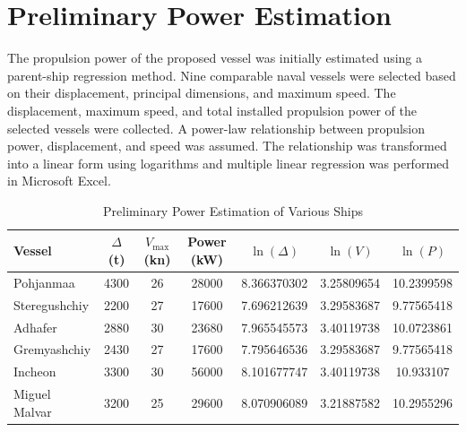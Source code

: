 \documentclass[12pt,a4paper,twoside]{report}
\begin{document}
\section{Preliminary Power Estimation}
The propulsion power of the proposed vessel was initially estimated using a parent-ship regression method. Nine comparable naval vessels were selected based on their displacement, principal dimensions, and maximum speed. The displacement, maximum speed, and total installed propulsion power of the selected vessels were collected. A power-law relationship between propulsion power, displacement, and speed was assumed. The relationship was transformed into a linear form using logarithms and multiple linear regression was performed in Microsoft Excel.
\begin{table}[htbp]
    \centering
    \caption{Preliminary Power Estimation of Various Ships}
    \label{tab:preliminary_power_estimation}

    \footnotesize
    \setlength{\tabcolsep}{3.5pt}

    \begin{tabular}{lcccccc}
        \toprule
        \textbf{Vessel} &
        \textbf{$\Delta$ (t)} &
        \textbf{$V_{\max}$ (kn)} &
        \textbf{Power (kW)} &
        \textbf{$\ln(\Delta)$} &
        \textbf{$\ln(V)$} &
        \textbf{$\ln(P)$} \\
        \midrule

        Pohjanmaa \cite{pohjanmaa_rmc}
        & 4300 & 26 & 28000
        & 8.366370302 & 3.25809654 & 10.2399598 \\

        Steregushchiy \cite{steregushchiy_oni}
        & 2200 & 27 & 17600
        & 7.696212639 & 3.29583687 & 9.77565418 \\

        Adhafer \cite{adhafer_c28a}
        & 2880 & 30 & 23680
        & 7.965545573 & 3.40119738 & 10.0723861 \\

        Gremyashchiy \cite{gremyashchiy_oni}
        & 2430 & 27 & 17600
        & 7.795646536 & 3.29583687 & 9.77565418 \\

        Incheon \cite{incheon_helis}
        & 3300 & 30 & 56000
        & 8.101677747 & 3.40119738 & 10.933107 \\

        Miguel Malvar \cite{miguel_malvar_pna}
        & 3200 & 25 & 29600
        & 8.070906089 & 3.21887582 & 10.2955296 \\


\end{tabular}
\end{table}
\end{document}
